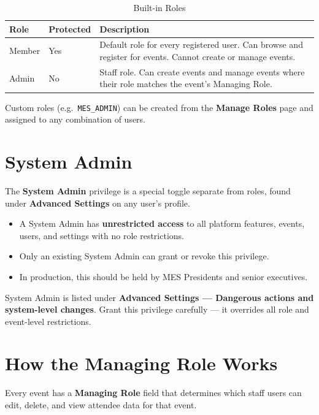 \documentclass[12pt, twoside]{report}
\newcommand{\uielem}[1]{\textbf{#1}}
\begin{document}
\begin{table}[H]
  \centering
  \caption{Built-in Roles}
  \begin{tabular}{@{} p{2.5cm} p{1.8cm} p{8.3cm} @{}}
    \toprule
    \textbf{Role} & \textbf{Protected} & \textbf{Description} \\
    \midrule
    Member  & Yes & Default role for every registered user. Can browse
                    and register for events. Cannot create or manage events. \\
    Admin   & No  & Staff role. Can create events and manage events
                    where their role matches the event's Managing Role. \\
    \bottomrule
  \end{tabular}
\end{table}

Custom roles (e.g.\ \texttt{MES\_ADMIN}) can be created from the
\uielem{Manage Roles} page and assigned to any combination of users.

\section{System Admin}

The \textbf{System Admin} privilege is a special toggle separate from roles,
found under \uielem{Advanced Settings} on any user's profile.

\begin{itemize}
  \item A System Admin has \textbf{unrestricted access} to all platform
        features, events, users, and settings with no role restrictions.
  \item Only an existing System Admin can grant or revoke this privilege.
  \item In production, this should be held by MES Presidents and senior executives.
\end{itemize}

\begin{warnbox}
System Admin is listed under \uielem{Advanced Settings --- Dangerous actions
and system-level changes}. Grant this privilege carefully --- it overrides
all role and event-level restrictions.
\end{warnbox}

\section{How the Managing Role Works}

Every event has a \textbf{Managing Role} field that determines which staff
users can edit, delete, and view attendee data for that event.
\end{document}
